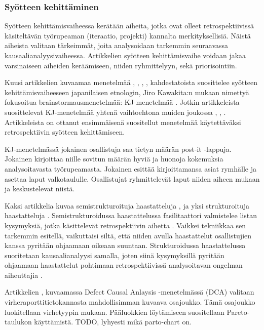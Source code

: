 \subsubsection{Syötteen kehittäminen}
Syötteen kehittämisvaiheessa kerätään aiheita, jotka ovat olleet retrospektiivissä käsiteltävän työrupeaman (iteraatio, projekti) kannalta merkityksellisiä. Näistä aiheista valitaan tärkeimmät, joita analysoidaan tarkemmin seuraavassa kausaalianalyysivaiheessa. Artikkelien syötteen kehittämisvaihe voidaan jakaa varsinaiseen aiheiden keräämiseen, niiden ryhmittelyyn, sekä priorisointiin.

Kuusi artikkelien kuvaamaa menetelmää \citep{birk2002postmortem}, \citep{dingsoyr2003extending}, \citep{staalhane2003post}, \citep{de2004learning}, \citep{Bjornson2009} kahdestatoista suosittelee syötteen kehittämisvaiheeseen japanilaisen etnologin, Jiro Kawakita:n mukaan nimettyä fokusoitua brainstormausmenetelmää: KJ-menetelmää \citep{dingsoyr2003extending}. Jotkin artikkeleista suosittelevat KJ-menetelmää yhtenä vaihtoehtona muiden joukossa \citep{birk2002postmortem}, \citep{staalhane2003post}, \citep{de2004learning}. Artikkeleista \citep{birk2002postmortem} on ottanut ensimmäisenä suositellut menetelmää käytettäväksi retrospektiivin syötteen kehittämiseen.

KJ-menetelmässä jokainen osallistuja saa tietyn määrän post-it -lappuja. Jokainen kirjoittaa niille sovitun määrän hyviä ja huonoja kokemuksia analysoitavasta työrupeamasta. Jokainen esittää kirjoittamansa asiat rymhälle ja asettaa laput valkotaululle. Osallistujat ryhmittelevät laput niiden aiheen mukaan ja keskustelevat niistä. \citep{birk2002postmortem}

Kaksi artikkelia kuvaa semistrukturoituja haastatteluja \citep{birk2002postmortem}, \citep{de2004learning} ja yksi strukturoituja haastatteluja \citep{staalhane2003post}. Semistrukturoidussa haastattelussa fasilitaattori valmistelee listan kysymyksiä, jotka käsittelevät retrospektiivin aihetta \citep{birk2002postmortem}. Vaikkei tekniikkaa sen tarkemmin esitellä, vaikuttaisi siltä, että niiden avulla haastattelut osallistujien kanssa pyritään ohjaamaan oikeaan suuntaan. Strukturoidussa haastattelussa suoritetaan kausaalianalyysi samalla, joten siinä kysymyksillä pyritään ohjaamaan haastattelut pohtimaan retrospektiivissä analysoitavan ongelman aiheuttajia \citep{staalhane2003post}.

Artikkelien \citep{kalinowski2012evidence}, \citep{card1998learning} kuvaamassa Defect Causal Anlaysis -menetelmässä (DCA) valitaan virheraporttitietokannasta mahdollisimman kuvaava osajoukko. Tämä osajoukko luokitellaan virhetyypin mukaan. Pääluokkien löytämiseen suositellaan Pareto-taulukon käyttämistä. TODO, lyhyesti mikä parto-chart on.

